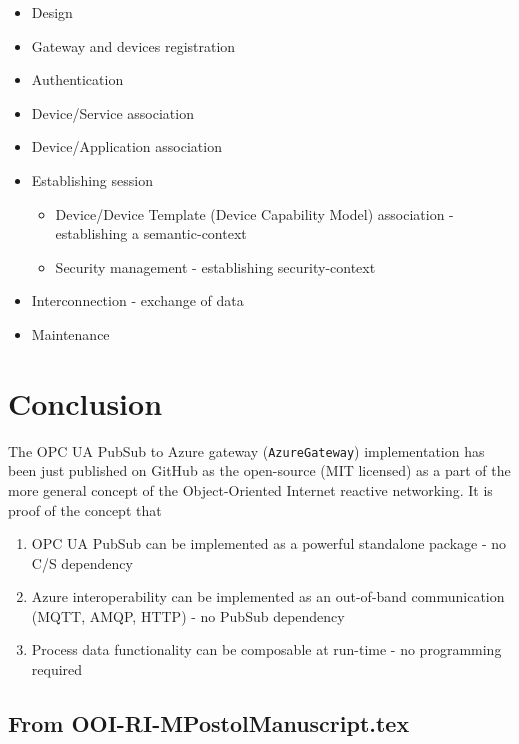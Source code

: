 \documentclass[
]{article}
\providecommand{\tightlist}{%
  \setlength{\itemsep}{0pt}\setlength{\parskip}{0pt}}
\begin{document}
\begin{itemize}
\tightlist
\item
  Design
\item
  Gateway and devices registration
\item
  Authentication
\item
  Device/Service association
\item
  Device/Application association
\item
  Establishing session

  \begin{itemize}
  \tightlist
  \item
    Device/Device Template (Device Capability Model) association -
    establishing a semantic-context
  \item
    Security management - establishing security-context
  \end{itemize}
\item
  Interconnection - exchange of data
\item
  Maintenance
\end{itemize}

\hypertarget{conclusion}{%
\section{Conclusion}\label{conclusion}}

The OPC UA PubSub to Azure gateway (\texttt{AzureGateway})
implementation has been just published on GitHub as the open-source (MIT
licensed) as a part of the more general concept of the Object-Oriented
Internet reactive networking. It is proof of the concept that

\begin{enumerate}
\def\labelenumi{\arabic{enumi}.}
\tightlist
\item
  OPC UA PubSub can be implemented as a powerful standalone package - no
  C/S dependency
\item
  Azure interoperability can be implemented as an out-of-band
  communication (MQTT, AMQP, HTTP) - no PubSub dependency
\item
  Process data functionality can be composable at run-time - no
  programming required
\end{enumerate}

\hypertarget{from-ooi-ri-mpostolmanuscript.tex-1}{%
\subsection{From
OOI-RI-MPostolManuscript.tex}\label{from-ooi-ri-mpostolmanuscript.tex-1}}
\end{document}
